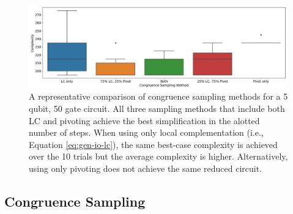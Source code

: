 \begin{figure}[t]
\centering
\includegraphics[width=13cm]{img/cong-sampling-ex.png}
\caption{
  A representative comparison of congruence sampling methods for a 5 qubit, 50 gate circuit.
  All three sampling methods that include both LC and pivoting achieve the best simplification in the alotted number of steps.
  When using only local complementation (i.e., Equation \ref{eq:gen-io-lc}), the same best-case complexity is achieved over the 10 trials but the average complexity is higher.
  Alternatively, using only pivoting does not achieve the same reduced circuit.
}
\label{fig:cong-sampling}
\end{figure}

\subsection*{Congruence Sampling}

